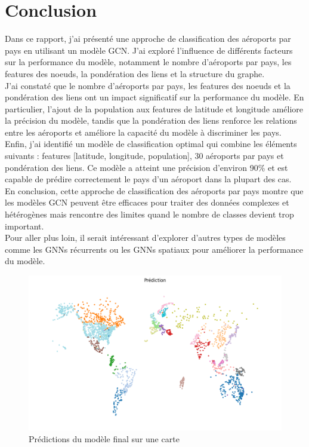 \clearpage  

\section{Conclusion}

Dans ce rapport, j'ai présenté une approche de classification des aéroports par
pays en utilisant un modèle GCN. J'ai exploré l'influence de différents facteurs
sur la performance du modèle, notamment le nombre d'aéroports par pays, les
features des noeuds, la pondération des liens et la structure du graphe.\\

J'ai constaté que le nombre d'aéroports par pays, les features des noeuds et la
pondération des liens ont un impact significatif sur la performance du modèle.
En particulier, l'ajout de la population aux features de latitude et longitude
améliore la précision du modèle, tandis que la pondération des liens renforce
les relations entre les aéroports et améliore la capacité du modèle à
discriminer les pays.\\

Enfin, j'ai identifié un modèle de classification optimal qui combine les
éléments suivants : features [latitude, longitude, population], 30 aéroports par
pays et pondération des liens. Ce modèle a atteint une précision d'environ 90\%
et est capable de prédire correctement le pays d'un aéroport dans la plupart des
cas.\\

En conclusion, cette approche de classification des aéroports par pays montre
que les modèles GCN peuvent être efficaces pour traiter des données complexes
et hétérogènes mais rencontre des limites quand le nombre de classes devient trop important.\\

Pour aller plus loin, il serait intéressant d'explorer d'autres types de modèles comme les GNNs récurrents ou les GNNs spatiaux pour améliorer la performance du modèle.

\begin{figure}[h!]
    \centering
    \includegraphics[width=\textwidth]{content/img/final-map.png}
    \caption{Prédictions du modèle final sur une carte}
    \label{fig:map}
\end{figure}
